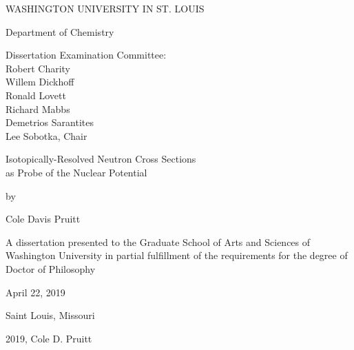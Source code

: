 \begin{titlepage}
    \begin{singlespace}
        \begin{center}
            \vspace*{1cm}

            WASHINGTON UNIVERSITY IN ST. LOUIS

            \vspace{0.5cm}
            Department of Chemistry

            \vspace{1.5cm}

            Dissertation Examination Committee:\\
            Robert Charity\\
            Willem Dickhoff\\ 
            Ronald Lovett\\
            Richard Mabbs\\
            Demetrios Sarantites\\
            Lee Sobotka, Chair\\

            \vspace{1.5 cm}

            Isotopically-Resolved Neutron Cross Sections\\
            as Probe of the Nuclear Potential

            \vspace{0.5 cm}

            by

            \vspace{0.5 cm}

            Cole Davis Pruitt

            \vfill

            A dissertation presented to the Graduate School of Arts and Sciences of Washington University in partial fulfillment of the requirements for the degree of Doctor of Philosophy

            \vspace{0.8cm}

            April 22, 2019

            \vspace{0.5 cm}
            Saint Louis, Missouri

        \end{center}
    \end{singlespace}
\end{titlepage}

\clearpage

\vspace*{\fill}
\begin{center}    
    \textcopyright \hspace{2pt} 2019, Cole D. Pruitt
\end{center}
\vspace*{\fill}

\thispagestyle{empty} %
\addtocounter{page}{-1}%
\clearpage
